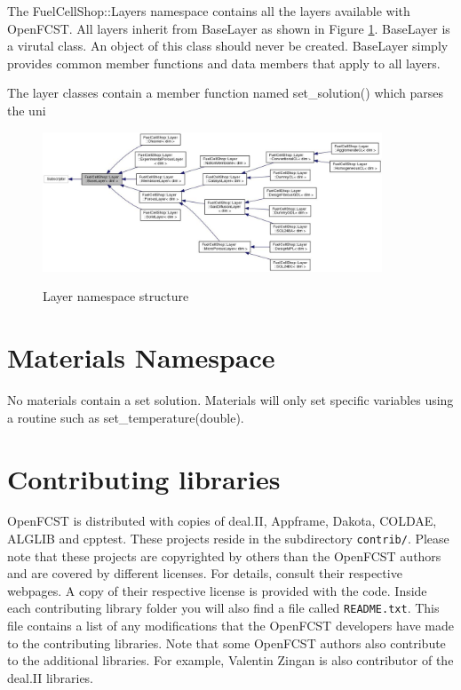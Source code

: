 The FuelCellShop::Layers namespace contains all the layers available with OpenFCST. All layers inherit from BaseLayer as shown in Figure \ref{fig:layerbase}. BaseLayer is a virutal class. An object of this class should never be created. BaseLayer simply provides common member functions and data members that apply to all layers. 



The layer classes contain a member function named set\_solution() which parses the uni

\begin{figure}
\begin{center}
\includegraphics[width=0.9\textwidth]{figures/classFuelCellShop_1_1Layer_1_1BaseLayer__inherit__graph.jpg}
\label{fig:layerbase}
\caption{Layer namespace structure}
\end{center}
\end{figure} 





\section{Materials Namespace}

No materials contain a set solution. Materials will only set specific variables using a routine such as set\_temperature(double).






\section{Contributing libraries}

OpenFCST is distributed with copies of deal.II, Appframe, Dakota, COLDAE, ALGLIB and cpptest. These projects reside in the subdirectory \texttt{contrib/}. Please note that these projects are copyrighted by others than the OpenFCST authors and are covered by different licenses. For details, consult their respective webpages. A copy of their respective license is provided with the code. Inside each contributing library folder you will also find a file called \texttt{README.txt}. This file contains a list of any modifications that the OpenFCST developers have made to the contributing libraries. Note that some OpenFCST authors also contribute to the additional libraries. For example, Valentin Zingan is also contributor of the deal.II libraries.

